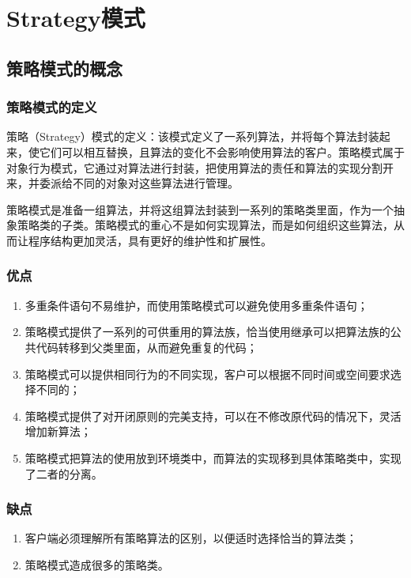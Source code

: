 \chapter{Strategy模式}
\section{策略模式的概念}
\subsection{策略模式的定义}
策略（Strategy）模式的定义：该模式定义了一系列算法，并将每个算法封装起来，使它们可以相互替换，且算法的变化不会影响使用算法的客户。策略模式属于对象行为模式，它通过对算法进行封装，把使用算法的责任和算法的实现分割开来，并委派给不同的对象对这些算法进行管理。
\par 策略模式是准备一组算法，并将这组算法封装到一系列的策略类里面，作为一个抽象策略类的子类。策略模式的重心不是如何实现算法，而是如何组织这些算法，从而让程序结构更加灵活，具有更好的维护性和扩展性。
\subsection{优点}
\begin{enumerate}
	\item 多重条件语句不易维护，而使用策略模式可以避免使用多重条件语句；
	\item 策略模式提供了一系列的可供重用的算法族，恰当使用继承可以把算法族的公共代码转移到父类里面，从而避免重复的代码；
	\item 策略模式可以提供相同行为的不同实现，客户可以根据不同时间或空间要求选择不同的；
	\item 策略模式提供了对开闭原则的完美支持，可以在不修改原代码的情况下，灵活增加新算法；
	\item 策略模式把算法的使用放到环境类中，而算法的实现移到具体策略类中，实现了二者的分离。
\end{enumerate}
\subsection{缺点}
\begin{enumerate}
	\item 客户端必须理解所有策略算法的区别，以便适时选择恰当的算法类；
	\item 策略模式造成很多的策略类。
\end{enumerate}

